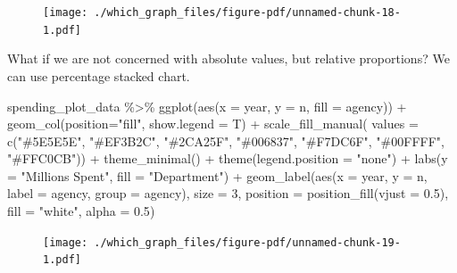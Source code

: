 \documentclass[
  letterpaper,
]{book}
\newenvironment{Shaded}{\begin{snugshade}}{\end{snugshade}}
\newcommand{\AttributeTok}[1]{\textcolor[rgb]{0.40,0.45,0.13}{#1}}
\newcommand{\DecValTok}[1]{\textcolor[rgb]{0.68,0.00,0.00}{#1}}
\newcommand{\FloatTok}[1]{\textcolor[rgb]{0.68,0.00,0.00}{#1}}
\newcommand{\FunctionTok}[1]{\textcolor[rgb]{0.28,0.35,0.67}{#1}}
\newcommand{\NormalTok}[1]{\textcolor[rgb]{0.00,0.23,0.31}{#1}}
\newcommand{\SpecialCharTok}[1]{\textcolor[rgb]{0.37,0.37,0.37}{#1}}
\newcommand{\StringTok}[1]{\textcolor[rgb]{0.13,0.47,0.30}{#1}}
\begin{document}
\begin{figure}[H]

{\centering \texttt{[image: ./which\_graph\_files/figure-pdf/unnamed-chunk-18-1.pdf]}

}

\end{figure}

What if we are not concerned with absolute values, but relative
proportions? We can use percentage stacked chart.

\begin{Shaded}
\begin{Highlighting}[]
\NormalTok{spending\_plot\_data }\SpecialCharTok{\%\textgreater{}\%} 
  \FunctionTok{ggplot}\NormalTok{(}\FunctionTok{aes}\NormalTok{(}\AttributeTok{x =}\NormalTok{ year, }\AttributeTok{y =}\NormalTok{ n, }\AttributeTok{fill =}\NormalTok{ agency)) }\SpecialCharTok{+} 
  \FunctionTok{geom\_col}\NormalTok{(}\AttributeTok{position=}\StringTok{"fill"}\NormalTok{, }\AttributeTok{show.legend =}\NormalTok{ T) }\SpecialCharTok{+}
  \FunctionTok{scale\_fill\_manual}\NormalTok{( }
    \AttributeTok{values =} \FunctionTok{c}\NormalTok{(}\StringTok{"\#5E5E5E"}\NormalTok{, }\StringTok{"\#EF3B2C"}\NormalTok{, }\StringTok{"\#2CA25F"}\NormalTok{, }\StringTok{"\#006837"}\NormalTok{, }\StringTok{"\#F7DC6F"}\NormalTok{, }\StringTok{"\#00FFFF"}\NormalTok{, }\StringTok{"\#FFC0CB"}\NormalTok{)) }\SpecialCharTok{+}
  \FunctionTok{theme\_minimal}\NormalTok{() }\SpecialCharTok{+} 
  \FunctionTok{theme}\NormalTok{(}\AttributeTok{legend.position =} \StringTok{"none"}\NormalTok{) }\SpecialCharTok{+} 
  \FunctionTok{labs}\NormalTok{(}\AttributeTok{y =} \StringTok{"Millions Spent"}\NormalTok{, }\AttributeTok{fill =} \StringTok{"Department"}\NormalTok{) }\SpecialCharTok{+}
  \FunctionTok{geom\_label}\NormalTok{(}\FunctionTok{aes}\NormalTok{(}\AttributeTok{x =}\NormalTok{ year, }\AttributeTok{y =}\NormalTok{ n, }\AttributeTok{label =}\NormalTok{ agency, }\AttributeTok{group =}\NormalTok{ agency), }\AttributeTok{size =} \DecValTok{3}\NormalTok{, }\AttributeTok{position =} \FunctionTok{position\_fill}\NormalTok{(}\AttributeTok{vjust =} \FloatTok{0.5}\NormalTok{), }\AttributeTok{fill =} \StringTok{"white"}\NormalTok{, }\AttributeTok{alpha =} \FloatTok{0.5}\NormalTok{)}
\end{Highlighting}
\end{Shaded}

\begin{figure}[H]

{\centering \texttt{[image: ./which\_graph\_files/figure-pdf/unnamed-chunk-19-1.pdf]}

}

\end{figure}
\end{document}

